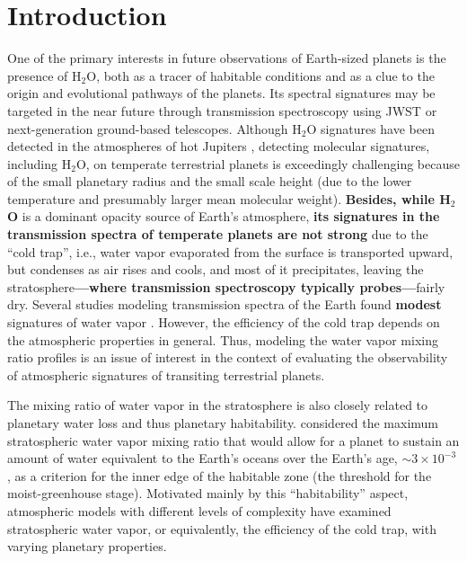 \documentclass[11pt,numberedappendix,twocolappendix,]{emulateapj}
\def\water{H$_2$O}
\def\wv{water vapor}
\def\revise#1{{\bf #1}}
\begin{document}



\section{Introduction}
\label{s:intro}

One of the primary interests in future observations of Earth-sized planets is the presence of \water{}, both as a tracer of habitable conditions and as a clue to the origin and evolutional pathways of the planets. 
Its spectral signatures may be targeted in the near future through transmission spectroscopy using JWST or next-generation ground-based telescopes.
%
Although \water{} signatures have been detected in the atmospheres of hot Jupiters \citep[e.g.][]{Tinetti2007,Sing2016}, detecting molecular signatures, including \water{}, on temperate terrestrial planets is exceedingly challenging \citep{Cowan2015} because of the small planetary radius and the small scale height (due to the lower temperature and presumably larger mean molecular weight). 
\revise{Besides, while \water{} } is a dominant opacity source of Earth's atmosphere, \revise{its signatures in the transmission spectra of temperate planets are not strong} due to the ``cold trap'', i.e., \wv{} evaporated from the surface is transported upward, but condenses as air rises and cools, and most of it precipitates, leaving the stratosphere\revise{---where transmission spectroscopy typically probes---}fairly dry. 
Several studies modeling transmission spectra of the Earth found \revise{modest} signatures of \wv{} \citep[e.g.][]{Ehrenreich2006, Kaltenegger2009, Betremieux2013, Misra2014}. 
However, the efficiency of the cold trap depends on the atmospheric properties in general. 
Thus, modeling the \wv{} mixing ratio profiles is an issue of interest in the context of evaluating the observability of atmospheric signatures of transiting terrestrial planets. 

The mixing ratio of \wv{} in the stratosphere is also closely related to planetary water loss and thus planetary habitability. 
\citet{Kasting1993} considered the maximum stratospheric \wv{} mixing ratio that would allow for a planet to sustain an amount of water equivalent to the  Earth's oceans over the Earth's age, $\sim 3 \times 10^{-3}$, as a criterion for the inner edge of the habitable zone (the threshold for the moist-greenhouse stage). 
Motivated mainly by this ``habitability'' aspect, atmospheric models with different levels of complexity have examined stratospheric \wv{}, or equivalently, the efficiency of the cold trap, with varying planetary properties. 
\end{document}
